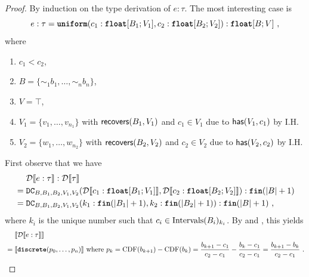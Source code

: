 \begin{proof}
	By induction on the type derivation of $e:\tau$. The most interesting case is 
	\[
	    e:\tau = \textnormal{\ttfamily\bfseries uniform}(c_1 : \mathnormal{\textnormal{\ttfamily\bfseries float}}[B_1; V_1], c_2 : \mathnormal{\textnormal{\ttfamily\bfseries float}}[B_2; V_2]) : \mathnormal{\textnormal{\ttfamily\bfseries float}}[B; V]~,
	\]
	where
	\begin{enumerate}
		\item $c_1 < c_2$,
		\item $B =  \{\sim_1\!\!b_1, \ldots, \sim_n\!\!b_n\}$,
		\item $V=\top$, 
		\item $V_1 = \{v_1,\ldots, v_{n_1}\}$ with $\mathsf{recovers}(B_1, V_1)$ and $c_1 \in V_1$ due to $\mathsf{has}(V_1, c_1)$ by I.H. 
		\item $V_2 = \{w_1,\ldots, w_{n_2}\}$ with $\mathsf{recovers}(B_2, V_2)$ and  $c_2 \in V_2$ due to $\mathsf{has}(V_2, c_2)$ by I.H. 
	\end{enumerate}
	First observe that we have 
	\begin{align*}
		&\mathcal{D}\llbracket  e:\tau \rrbracket : \mathcal{D}\llbracket \tau \rrbracket \\
		{}={}& \texttt{DC}_{B,B_1,B_2,V_1,V_2}(\mathcal{D}\llbracket c_1 : \mathnormal{\textnormal{\ttfamily\bfseries float}}[B_1; V_1] \rrbracket, \mathcal{D}\llbracket c_2 :  \mathnormal{\textnormal{\ttfamily\bfseries float}}[B_2; V_2] \rrbracket) : \textnormal{\ttfamily\bfseries fin}(|B| + 1)\\
		{}={}&\texttt{DC}_{B,B_1,B_2,V_1,V_2}( k_1 : \textnormal{\ttfamily\bfseries fin}(|B_1| + 1), k_2:\textnormal{\ttfamily\bfseries fin}(|B_2|+1) ) : \textnormal{\ttfamily\bfseries fin}(|B|+1)~,
	\end{align*}
	where $k_i$ is the unique number such that $c_i \in \text{Intervals}(B_i)_{k_i}$. By  and , this yields
	\begin{align*}
		 & \llbracket \mathcal{D}\llbracket e:\tau \rrbracket \rrbracket \\
		 {}={}& \llbracket \textnormal{\ttfamily\bfseries discrete}(p_0,\ldots,p_n) \rrbracket~\text{where}~p_k = \text{CDF}(b_{k+1}) - \text{CDF}(b_k) = \frac{b_{k+1} - c_1}{c_2-c_1} - \frac{b_{k} - c_1}{c_2-c_1}  =  \frac{b_{k+1} - b_k}{c_2-c_1}~. 
	\end{align*}
	

\end{proof}
